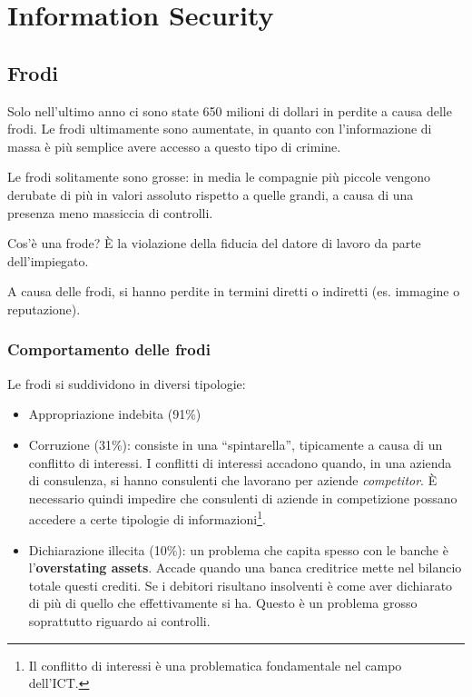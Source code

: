 \part{Information Security}

\chapter{Frodi}
\label{Frodi}

Solo nell'ultimo anno ci sono state 650 milioni di dollari in perdite a causa delle 
frodi. Le frodi ultimamente sono aumentate, in quanto con l'informazione di massa 
è più semplice avere accesso a questo tipo di crimine.

Le frodi solitamente sono grosse: in media le compagnie più piccole vengono
derubate di più in valori assoluto rispetto a quelle grandi, a causa di una presenza
meno massiccia di controlli.

Cos'è una frode? È la violazione della fiducia del datore di lavoro da parte 
dell'impiegato.

A causa delle frodi, si hanno perdite in termini diretti o 
indiretti (es. immagine o reputazione).

\section{Comportamento delle frodi}

Le frodi si suddividono in diversi tipologie:

\begin{itemize}
  \item Appropriazione indebita (91\%)
  \item Corruzione (31\%): consiste in una ``spintarella'', tipicamente a causa di un conflitto di 
  interessi. I conflitti di interessi accadono quando, in una azienda di 
  consulenza, si hanno consulenti che lavorano per aziende \textit{competitor}.
  È necessario quindi impedire che consulenti di aziende in competizione possano 
  accedere a   certe tipologie di informazioni\footnote{Il conflitto di interessi è una
  problematica fondamentale nel campo dell'ICT.}.
  \item Dichiarazione illecita (10\%): un problema che capita spesso con le banche è l'\textbf{overstating assets}.
  Accade quando una banca creditrice mette nel bilancio totale questi crediti.
  Se i debitori risultano insolventi è come aver dichiarato di più di quello
  che effettivamente si ha. Questo è un problema grosso soprattutto riguardo ai
  controlli.
\end{itemize}
